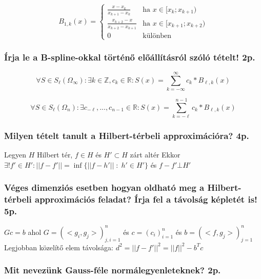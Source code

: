 \documentclass[12pt,a4paper]{article}
\begin{document}
$$B_{1,k}(x) = \begin{cases}
	\frac{x-x_k}{x_{k+1} - x_k} & \text{ha } x \in [x_k;x_{k+1}) \\
	\frac{x_{k+2}-x}{x_{k+2} - x_{k+1}} & \text{ha } x \in [x_{k+1};x_{k+2}) \\
	0 & \text{különben}
\end{cases}$$

\subsubsection{Írja le a B-spline-okkal történő előállításról szóló tételt! 2p.}

$$
\forall S \in S_\ell(\Omega_\infty): \exists k \in \mathbb{Z}, c_k \in \mathbb{R}:
S(x) = \sum_{k=-\infty}^{\infty} c_k * B_{\ell,k}(x)
$$

$$
\forall S \in S_\ell(\Omega_n): \exists c_{-\ell}, ..., c_{n-1} \in \mathbb{R}:
S(x) = \sum_{k=-\ell}^{n-1} c_k * B_{\ell,k}(x)
$$

\subsubsection{Milyen tételt tanult a Hilbert-térbeli approximációra? 4p.}

\begin{outline}
	\1 Legyen $H$ Hilbert tér, $f \in H$ és $H' \subset H$ zárt altér
	\1 Ekkor $\exists! f' \in H': ||f - f'||=\inf\{ ||f-h'|| \;:\; h' \in H' \}$ és $f - f' \bot H'$
\end{outline}

\subsubsection{Véges dimenziós esetben hogyan oldható meg a Hilbert-térbeli approximációs feladat? Írja fel a távolság képletét is! 5p.}

\begin{outline}
	\1 $Gc=b$ ahol $G=(<g_i,g_j>)^n_{j,i=1}$ és $c=(c_i)^n_{i=1}$ és $b=(<f,g_j>)^n_{j=1}$
	\1 Legjobban közelítő elem távolsága: $d^2 = ||f-f'||^2=||f||^2-b^Tc$
\end{outline}

\pagebreak

\subsubsection{Mit nevezünk Gauss-féle normálegyenleteknek? 2p.}
\end{document}
